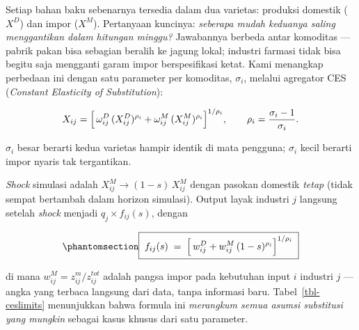 \documentclass[
  manuscript=article,
  layout=publish,
  year=2026,
  volume=1,
]{den}
\begin{document}
Setiap bahan baku sebenarnya tersedia dalam dua varietas: produksi
domestik (\(X^D\)) dan impor (\(X^M\)). Pertanyaan kuncinya:
\emph{seberapa mudah keduanya saling menggantikan dalam hitungan
minggu?} Jawabannya berbeda antar komoditas --- pabrik pakan bisa
sebagian beralih ke jagung lokal; industri farmasi tidak bisa begitu
saja mengganti garam impor berspesifikasi ketat. Kami menangkap
perbedaan ini dengan satu parameter per komoditas, \(\sigma_i\), melalui
agregator CES (\emph{Constant Elasticity of Substitution}):

\[
X_{ij} = \Bigl[\, \omega^{D}_{ij} \,(X^{D}_{ij})^{\rho_i}
        + \omega^{M}_{ij}\,(X^{M}_{ij})^{\rho_i} \Bigr]^{1/\rho_i},
\qquad \rho_i = \frac{\sigma_i - 1}{\sigma_i}.
\]

\(\sigma_i\) besar berarti kedua varietas hampir identik di mata
pengguna; \(\sigma_i\) kecil berarti impor nyaris tak tergantikan.

\emph{Shock} simulasi adalah \(X^{M}_{ij} \to (1-s)\,X^{M}_{ij}\) dengan
pasokan domestik \emph{tetap} (tidak sempat bertambah dalam horizon
simulasi). Output layak industri \(j\) langsung setelah \emph{shock}
menjadi \(q_j \times f_{ij}(s)\), dengan

\begin{equation}\phantomsection\label{eq-cesfactor}{
\boxed{\;
f_{ij}(s) \;=\;
\Bigl[\, w^{D}_{ij} + w^{M}_{ij}\,(1-s)^{\rho_i} \Bigr]^{1/\rho_i}
\;}
}\end{equation}

di mana \(w^{M}_{ij} = z^{m}_{ij} / z^{tot}_{ij}\) adalah pangsa impor
pada kebutuhan input \(i\) industri \(j\) --- angka yang terbaca
langsung dari data, tanpa informasi baru. Tabel~\ref{tbl-ceslimits}
menunjukkan bahwa formula ini \emph{merangkum semua asumsi substitusi
yang mungkin} sebagai kasus khusus dari satu parameter.
\end{document}
